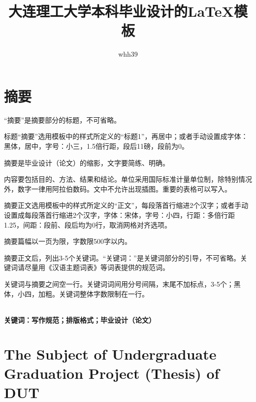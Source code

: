 \documentclass[UTF8,a4paper]{ctexart}
\numberwithin{table}{section}
\numberwithin{equation}{section}
\begin{document}
	\title{大连理工大学本科毕业设计的\LaTeX 模板}
	\author{whh39}  
	\maketitle
	\newpage
	\section*{\fontsize{15}{22.5} {\heiti 摘\quad\quad 要}}
	“摘要”是摘要部分的标题，不可省略。\par 
	标题“摘要”选用模板中的样式所定义的“标题1”，再居中；或者手动设置成字体：黑体，居中，字号：小三，1.5倍行距，段后11磅，段前为0。\par 
	摘要是毕业设计（论文）的缩影，文字要简练、明确。\par 
	内容要包括目的、方法、结果和结论。单位采用国际标准计量单位制，除特别情况外，数字一律用阿拉伯数码。文中不允许出现插图。重要的表格可以写入。\par 
	摘要正文选用模板中的样式所定义的“正文”，每段落首行缩进2个汉字；或者手动设置成每段落首行缩进2个汉字，字体：宋体，字号：小四，行距：多倍行距 1.25，间距：段前、段后均为0行，取消网格对齐选项。\par 
	摘要篇幅以一页为限，字数限500字以内。\par 
	摘要正文后，列出3-5个关键词。“关键词：”是关键词部分的引导，不可省略。关键词请尽量用《汉语主题词表》等词表提供的规范词。\par 
	关键词与摘要之间空一行。关键词词间用分号间隔，末尾不加标点，3-5个；黑体，小四，加粗。关键词整体字数限制在一行。\par 
	\quad \\
	{\bf{\heiti 关键词：写作规范；排版格式；毕业设计（论文）}}
	
	\newpage
	\section*{{\fontsize{15}{22.5} {The Subject of Undergraduate Graduation Project (Thesis) of DUT}}}
\end{document}
